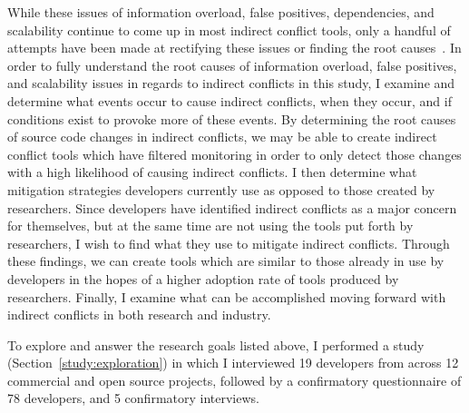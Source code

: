 While these issues of information overload, false positives, dependencies, and scalability continue to come up
in most indirect conflict tools, only a handful of attempts have been made at rectifying these issues or
finding the root causes~\cite{Holmes:2010:CAR,Kim:2011:ESA}. 
In order to fully understand the root causes of information overload, false positives, and
scalability issues in regards to indirect conflicts in this study, I examine and determine what events occur to
cause indirect conflicts, when they occur, and if conditions exist to provoke more of these events. By determining the root
causes of source code changes in indirect conflicts, we may be able to create indirect conflict tools which have filtered
monitoring in order to only detect those changes with a high likelihood of causing indirect conflicts.
I then determine what mitigation strategies developers currently use as opposed to those created
by researchers. Since developers have identified indirect conflicts as a major concern for themselves, but at
the same time are not using the tools put forth by researchers, I wish to find what they use to mitigate indirect
conflicts. Through these findings, we can create tools which are similar to those already in use by developers in
the hopes of a higher adoption rate of tools produced by researchers.
Finally, I examine what can be accomplished moving forward with indirect conflicts
in both research and industry.

To explore and answer the research goals listed above, I performed a study (Section~\ref{study:exploration}) in which I 
interviewed 19 developers from across 12 commercial and open source projects, 
followed by a confirmatory questionnaire of 78 developers, and 5 confirmatory interviews.

